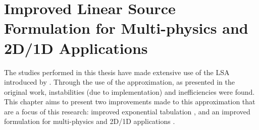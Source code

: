 \chapter{Improved Linear Source Formulation for Multi-physics and 2D/1D Applications}{
  \label{ch:Improved Linear Source Formulation for Multi-physics and 2D/1D Applications}
  
  
  
  \def\figpath{chapters/LSMOC/figures/}
  \graphicspath{ {\figpath} }


  The studies performed in this thesis have made extensive use of the \acf{LSA} introduced by \citet{Ferrer2016}.
  Through the use of the approximation, as presented in the original work, instabilities (due to implementation) and inefficiencies were found.
  This chapter aims to present two improvements made to this approximation that are a focus of this research: improved exponential tabulation \cite{Fitzgerald2018}, and an improved formulation for multi-physics and 2D/1D applications \cite{Fitzgerald2019}.

}
